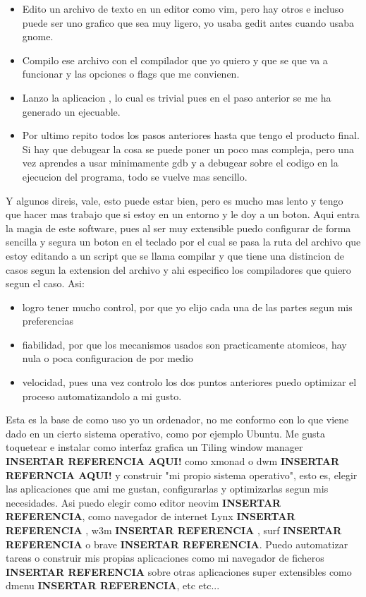 \begin{itemize}

\item Edito un archivo de texto en un editor como vim, pero hay otros e incluso puede ser uno grafico que sea muy ligero, yo usaba gedit antes cuando usaba gnome. 

\item Compilo ese archivo con el compilador que yo quiero y que se que va a funcionar y las opciones o flags que me convienen.

\item Lanzo la aplicacion , lo cual es trivial pues en el paso anterior se me ha generado un ejecuable.

\item Por ultimo repito todos los pasos anteriores hasta que tengo el producto final. Si hay que debugear la cosa se puede poner un poco mas compleja, pero una vez aprendes a usar minimamente gdb y a debugear sobre el codigo en la ejecucion del programa, todo se vuelve mas sencillo.

\end{itemize}

Y algunos direis, vale, esto puede estar bien, pero es mucho mas lento y tengo que hacer mas trabajo que si estoy en un entorno y le doy a un boton. Aqui entra la magia de este software, pues al ser muy extensible puedo configurar de forma sencilla y segura un boton en el teclado por el cual se pasa la ruta del archivo que estoy editando a un script que se llama compilar y que tiene una distincion de casos segun la extension del archivo y ahi especifico los compiladores que quiero segun el caso. Asi:

\begin{itemize}

\item
logro tener mucho control, por que yo elijo cada una de las partes segun mis preferencias
\item fiabilidad, por que los mecanismos usados son practicamente atomicos, hay nula o poca configuracion de por medio
\item velocidad, pues una vez controlo los dos puntos anteriores puedo optimizar el proceso automatizandolo a mi gusto.

\end{itemize}

Esta es la base de como uso yo un ordenador, no me conformo con lo que viene dado en un cierto sistema operativo, como por ejemplo Ubuntu. Me gusta toquetear e instalar como interfaz grafica un Tiling window manager \textbf{INSERTAR REFERENCIA AQUI!} como xmonad o dwm \textbf{INSERTAR REFERNCIA AQUI!} y construir "mi propio sistema operativo", esto es, elegir las aplicaciones que ami me gustan, configurarlas y optimizarlas segun mis necesidades. Asi puedo elegir como editor neovim \textbf{INSERTAR REFERENCIA}, como navegador de internet Lynx \textbf{INSERTAR REFERENCIA} , w3m \textbf{INSERTAR REFERENCIA} , surf \textbf{INSERTAR REFERENCIA} o brave \textbf{INSERTAR REFERENCIA}. Puedo automatizar tareas o construir mis propias aplicaciones como mi navegador de ficheros \textbf{INSERTAR REFERENCIA} sobre otras aplicaciones super extensibles como dmenu \textbf{INSERTAR REFERENCIA}, etc etc...  

